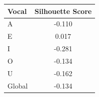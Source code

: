 \begin{tabular}{lc}
\toprule
\rowcolor{col01}
Vocal & Silhouette Score \\
\midrule
A & -0.110 \\
E & 0.017 \\
I & -0.281 \\
O & -0.134 \\
U & -0.162 \\
Global & -0.134 \\
\bottomrule
\end{tabular}
